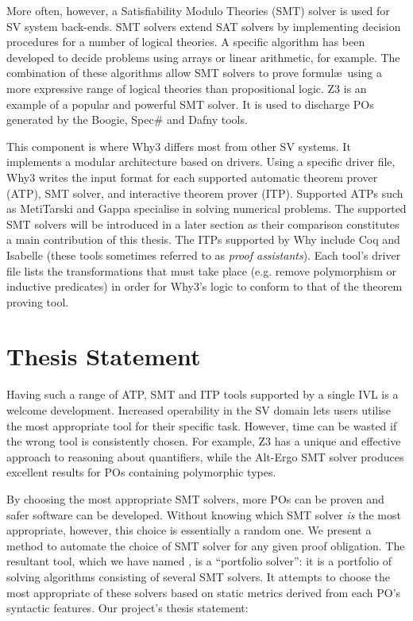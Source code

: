 More often, however, a Satisfiability Modulo Theories (SMT) solver is used for SV system back-ends. SMT solvers extend SAT solvers by implementing decision procedures for a number of logical theories. A specific algorithm has been developed to decide problems using arrays or linear arithmetic, for example. The combination of these algorithms allow SMT solvers to prove formul\ae~using a more expressive range of logical theories than propositional logic. Z3 \cite{Z3} is an example of a popular and powerful SMT solver. It is used to discharge POs generated by the Boogie, Spec\# and Dafny tools. 

This component is where \textsf{Why3} differs most from other SV systems.
It implements a modular architecture based on drivers.
Using a specific driver file, \textsf{Why3} writes the input format for each supported automatic theorem prover (ATP), SMT solver, and interactive theorem prover (ITP).
Supported ATPs such as MetiTarski \cite{Akbarpour2008} and Gappa \cite{gappa} specialise in solving numerical problems.
The supported SMT solvers will be introduced in a later section as their comparison constitutes a main contribution of this thesis.
The ITPs supported by \textsf{Why} include Coq \cite{Coq} and Isabelle \cite{Isabelle} (these tools sometimes referred to as \textit{proof assistants}).
Each tool's driver file lists the transformations that must take place (e.g. remove polymorphism or inductive predicates) in order for \textsf{Why3}'s logic to conform to that of the theorem proving tool.

\section{Thesis Statement}

Having such a range of ATP, SMT and ITP tools supported by a single IVL is a welcome development.
Increased operability in the SV domain lets users utilise the most appropriate tool for their specific task.
However, time can be wasted if the wrong tool is consistently chosen. 
For example, Z3 has a unique and effective approach to reasoning about quantifiers, while the Alt-Ergo \cite{AltErgo} SMT solver produces excellent results for POs containing polymorphic types.

By choosing the most appropriate SMT solvers, more POs can be proven and safer software can be developed.
Without knowing which SMT solver \textit{is} the most appropriate, however, this choice is essentially a random one.
We present a method to automate the choice of SMT solver for any given proof obligation.
The resultant tool, which we have named \where, is a ``portfolio solver'': it is a portfolio of solving algorithms consisting of several SMT solvers.
It attempts to choose the most appropriate of these solvers based on static metrics derived from each PO's syntactic features.  
Our project's thesis statement: 
 
